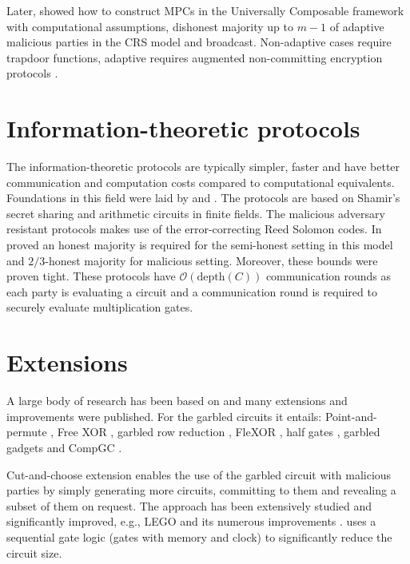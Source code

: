 \documentclass[
  digital, %
  twoside, %
  table,   %
  lof,     %
  lot,     %
]{fithesis3}
\newcommand{\bigO}[0]{\mathcal{O}}
\theoremstyle{definition}
\theoremstyle{remark}
\begin{document}
Later, \cite{CLOS02} showed how to construct MPCs in the Universally Composable framework with computational assumptions, dishonest majority up to $m-1$ of adaptive malicious parties in the CRS model and broadcast. 
Non-adaptive cases require trapdoor functions, adaptive requires augmented non-committing encryption protocols \cite{CFGN96}.

\section{Information-theoretic protocols}\label{sec:soa:infproto}%
The information-theoretic protocols are typically simpler, faster and have better communication and computation costs compared to computational equivalents. Foundations in this field were laid by \cite{BGW88} and \cite{CCD88}. The protocols are based on Shamir's secret sharing and arithmetic circuits in finite fields. The malicious adversary resistant protocols makes use of the error-correcting Reed Solomon codes. In \cite{BGW88} proved an honest majority is required for the semi-honest setting in this model and $2/3$-honest majority for malicious setting. Moreover, these bounds were proven tight. These protocols have $\bigO(\text{depth}(C))$ communication rounds as each party is evaluating a circuit and a communication round is required to securely evaluate multiplication gates.

\section{Extensions}\label{sec:soa:extensions}%
A large body of research has been based on \cite{Yao86, GMW87, BGW88, CCD88} and many extensions and improvements were published. 
For the garbled circuits it entails: Point-and-permute \cite{BMR90}, Free XOR \cite{KS08}, garbled row reduction \cite{NPS99, PSSW09}, FleXOR \cite{KMR14}, half gates \cite{ZRE14}, garbled gadgets \cite{BMR16} and CompGC \cite{cryptoeprint:2016:458}.

Cut-and-choose extension \cite{LP07,LP11,Lin16} enables the use of the garbled circuit with malicious parties by simply generating more circuits, committing to them and revealing a subset of them on request. The approach has been extensively studied and significantly improved, e.g., LEGO \cite{NO09} and its numerous improvements \cite{cryptoeprint:2013:155, FJNT15, cryptoeprint:2016:1069, cryptoeprint:2017:226, KNBTR17, cryptoeprint:2018:578}.
\cite{SHSSK15} uses a sequential gate logic (gates with memory and clock) to significantly reduce the circuit size. %
\end{document}
